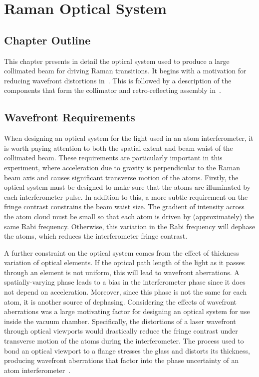 \chapter{Raman Optical System}\label{chap:raman_optics}

\section{Chapter Outline}
This chapter presents in detail the optical system used to produce a
large collimated beam for driving Raman transitions. It begins with a
motivation for reducing wavefront distortions
in~. This is followed by a description
of the components that form the collimator and retro-reflecting
assembly in~.  
\section{Wavefront Requirements}\label{sec:wavefront_req}
When designing an optical system for the light used in an atom interferometer,
it is worth paying attention to both the spatial extent and beam waist of the
collimated beam. These requirements are particularly important in this
experiment, where acceleration due to gravity is perpendicular to the Raman beam
axis and causes significant transverse motion of the atoms. Firstly, the optical
system must be designed to make sure that the atoms are illuminated by each
interferometer pulse. In addition to this, a more subtle requirement on the
fringe contrast constrains the beam waist size. The gradient of intensity across
the atom cloud must be small so that each atom is driven by (approximately) the
same Rabi frequency. Otherwise, this variation in the Rabi frequency will
dephase the atoms, which reduces the interferometer fringe contrast.
\par\noindent A further constraint on the optical system comes from the effect
of thickness variation of optical elements. If the optical path length of the
light as it passes through an element is not uniform, this will lead to
wavefront aberrations. A spatially-varying phase leads to a bias in the
interferometer phase since it does not depend on acceleration. Moreover, since
this phase is not the same for each atom, it is another source of dephasing.
Considering the effects of wavefront aberrations was a large motivating factor
for designing an optical system for use inside the vacuum chamber. Specifically,
the distortions of a laser wavefront through optical viewports would drastically
reduce the fringe contrast under transverse motion of the atoms during the
interferometer. The process used to bond an optical viewport to a flange
stresses the glass and distorts its thickness, producing wavefront aberrations
that factor into the phase uncertainty of an atom
interferometer~\cite{Schkolnik2015a}. 
